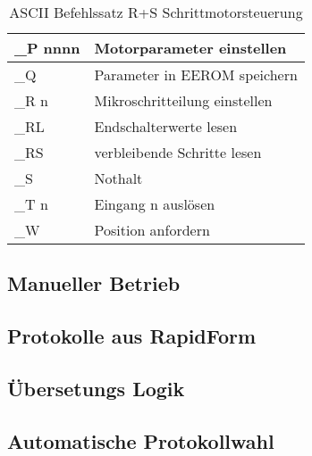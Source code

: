 \begin{table}[htb]
\begin{tabular}{|l|l|}
\rule[-1ex]{0pt}{2.5ex} \_P nnnn 	& Motorparameter einstellen                    \\ \hline 
\rule[-1ex]{0pt}{2.5ex} \_Q 		& Parameter in EEROM speichern                 \\ \hline 
\rule[-1ex]{0pt}{2.5ex} \_R n 		& Mikroschritteilung einstellen                \\ \hline 
\rule[-1ex]{0pt}{2.5ex} \_RL 		& Endschalterwerte lesen                       \\ \hline 
\rule[-1ex]{0pt}{2.5ex} \_RS  		& verbleibende Schritte lesen                  \\ \hline 
\rule[-1ex]{0pt}{2.5ex} \_S   		& Nothalt                                      \\ \hline 
\rule[-1ex]{0pt}{2.5ex} \_T n 		& Eingang n auslösen                           \\ \hline 
\rule[-1ex]{0pt}{2.5ex} \_W   		& Position anfordern                           \\ \hline 
\end{tabular} 
\caption{ASCII Befehlssatz R+S Schrittmotorsteuerung}\cite{rs:ug_stepper}
\label{tbl:ASCII_RS}
\end{table}
 


\subsection{Manueller Betrieb}
\subsection{Protokolle aus RapidForm}
\subsection{Übersetungs Logik}
\subsection{Automatische Protokollwahl}